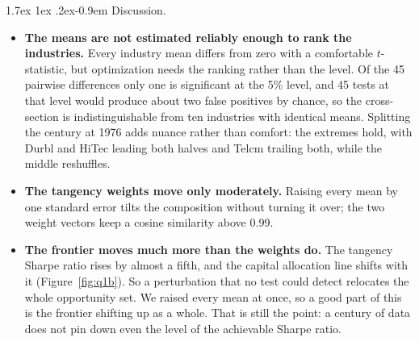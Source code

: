 \documentclass[11pt]{article}
\makeatletter
\renewcommand\paragraph{\@startsection{paragraph}{4}{0pt}%
  {1.7ex \@plus 1ex \@minus .2ex}{-0.9em}%
  {\normalfont\bfseries\normalsize\color{psink}}}
\makeatother
\begin{document}
\paragraph{Discussion.}
\begin{itemize}
\setlength{\itemsep}{4pt}\setlength{\parskip}{0pt}

\item \textbf{The means are not estimated reliably enough to rank the
industries.} Every industry mean differs from zero with a comfortable
$t$-statistic, but optimization needs the ranking rather than the level. Of
the 45 pairwise differences only one is significant at the 5\% level, and 45
tests at that level would produce about two false positives by chance, so the
cross-section is indistinguishable from ten industries with identical means.
Splitting the century at 1976 adds nuance rather than comfort: the extremes
hold, with Durbl and HiTec leading both halves and Telcm trailing both, while
the middle reshuffles.

\item \textbf{The tangency weights move only moderately.} Raising every mean
by one standard error tilts the composition without turning it over; the two
weight vectors keep a cosine similarity above 0.99.

\item \textbf{The frontier moves much more than the weights do.} The tangency
Sharpe ratio rises by almost a fifth, and the capital allocation line shifts
with it (Figure~\ref{fig:q1b}). So a perturbation that no test could detect
relocates the whole opportunity set. We raised every mean at once, so a good
part of this is the frontier shifting up as a whole. That is still the point:
a century of data does not pin down even the level of the achievable Sharpe
ratio.

\end{itemize}
\end{document}
